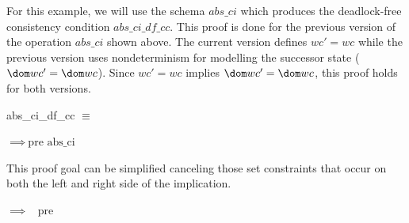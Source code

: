 %
%
For this example, we will use the schema $abs\_ci$ which produces the
deadlock-free consistency condition $abs\_ci\_df\_cc$. This proof is done for
the previous version of the operation $abs\_ci$ shown above. The current version
defines $wc' = wc$ while the previous version uses nondeterminism for modelling
the successor state ($\dom wc' = \dom wc$). Since $wc' = wc$ implies $\dom wc'
= \dom wc$,
this proof holds for both versions.\\
\begin{center}
\mbox{abs\_ci\_df\_cc} $\equiv$
\begin{minipage}{5 cm}
\end{minipage}
$\implies
~\mbox{pre abs\_ci}$\\%
\end{center}
%
%
This proof goal can be simplified canceling those set constraints
that occur on both the left and right side of the implication.
\begin{center}
  \begin{minipage}{5 cm}
  \end{minipage}
  $\implies $%
~\mbox{pre }
  \begin{minipage}{5.5 cm}
  \end{minipage}
\end{center}
